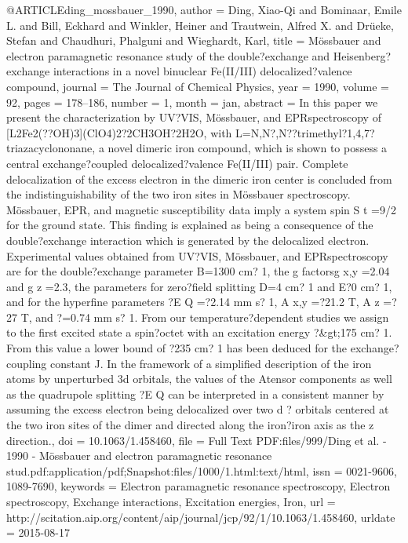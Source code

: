 @ARTICLE{ding_mossbauer_1990,
  author = {Ding, Xiao-Qi and Bominaar, Emile L. and Bill, Eckhard and Winkler,
	Heiner and Trautwein, Alfred X. and Drüeke, Stefan and Chaudhuri,
	Phalguni and Wieghardt, Karl},
  title = {Mössbauer and electron paramagnetic resonance study of the double?exchange
	and {Heisenberg}?exchange interactions in a novel binuclear {Fe}({II}/{III})
	delocalized?valence compound},
  journal = {The Journal of Chemical Physics},
  year = {1990},
  volume = {92},
  pages = {178--186},
  number = {1},
  month = jan,
  abstract = {In this paper we present the characterization by UV?VIS, Mössbauer,
	and EPRspectroscopy of [L2Fe2(??OH)3](ClO4)2?2CH3OH?2H2O, with L=N,N?,N??trimethyl?1,4,7?triazacyclononane,
	a novel dimeric iron compound, which is shown to possess a central
	exchange?coupled delocalized?valence Fe(II/III) pair. Complete delocalization
	of the excess electron in the dimeric iron center is concluded from
	the indistinguishability of the two iron sites in Mössbauer spectroscopy.
	Mössbauer, EPR, and magnetic susceptibility data imply a system spin
	S t =9/2 for the ground state. This finding is explained as being
	a consequence of the double?exchange interaction which is generated
	by the delocalized electron. Experimental values obtained from UV?VIS,
	Mössbauer, and EPRspectroscopy are for the double?exchange parameter
	B=1300 cm? 1, the g factorsg x,y =2.04 and g z =2.3, the parameters
	for zero?field splitting D=4 cm? 1 and E?0 cm? 1, and for the hyperfine
	parameters ?E Q =?2.14 mm s? 1, A x,y =?21.2 T, A z =?27 T, and ?=0.74
	mm s? 1. From our temperature?dependent studies we assign to the
	first excited state a spin?octet with an excitation energy ?\&gt;175
	cm? 1. From this value a lower bound of ?235 cm? 1 has been deduced
	for the exchange?coupling constant J. In the framework of a simplified
	description of the iron atoms by unperturbed 3d orbitals, the values
	of the Atensor components as well as the quadrupole splitting ?E
	Q can be interpreted in a consistent manner by assuming the excess
	electron being delocalized over two d ? orbitals centered at the
	two iron sites of the dimer and directed along the iron?iron axis
	as the z direction.},
  doi = {10.1063/1.458460},
  file = {Full Text PDF:files/999/Ding et al. - 1990 - Mössbauer and electron paramagnetic resonance stud.pdf:application/pdf;Snapshot:files/1000/1.html:text/html},
  issn = {0021-9606, 1089-7690},
  keywords = {Electron paramagnetic resonance spectroscopy, Electron spectroscopy,
	Exchange interactions, Excitation energies, Iron},
  url = {http://scitation.aip.org/content/aip/journal/jcp/92/1/10.1063/1.458460},
  urldate = {2015-08-17}
}

